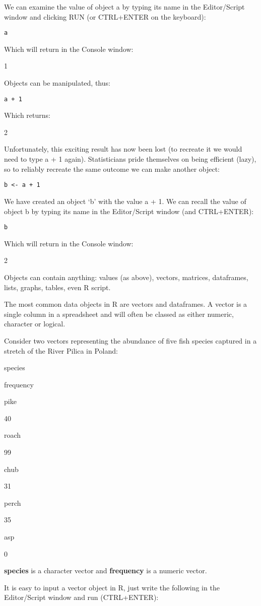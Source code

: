 \documentclass[
]{book}
\begin{document}
We can examine the value of object a by typing its name in the
Editor/Script window and clicking RUN (or CTRL+ENTER on the keyboard):

\texttt{a}

Which will return in the Console window:

1

Objects can be manipulated, thus:

\texttt{a\ +\ 1}

Which returns:

2

Unfortunately, this exciting result has now been lost (to recreate it we
would need to type a + 1 again). Statisticians pride themselves on being
efficient (lazy), so to reliably recreate the same outcome we can make
another object:

\texttt{b\ \textless{}-\ a\ +\ 1}

We have created an object `b' with the value a + 1. We can recall the
value of object b by typing its name in the Editor/Script window (and
CTRL+ENTER):

\texttt{b}

Which will return in the Console window:

2

Objects can contain anything: values (as above), vectors, matrices,
dataframes, lists, graphs, tables, even R script.

The most common data objects in R are vectors and dataframes. A vector
is a single column in a spreadsheet and will often be classed as either
numeric, character or logical.

Consider two vectors representing the abundance of five fish species
captured in a stretch of the River Pilica in Poland:

species

frequency

pike

40

roach

99

chub

31

perch

35

asp

0

\textbf{species} is a character vector and \textbf{frequency} is a
numeric vector.

It is easy to input a vector object in R, just write the following in
the Editor/Script window and run (CTRL+ENTER):
\end{document}
